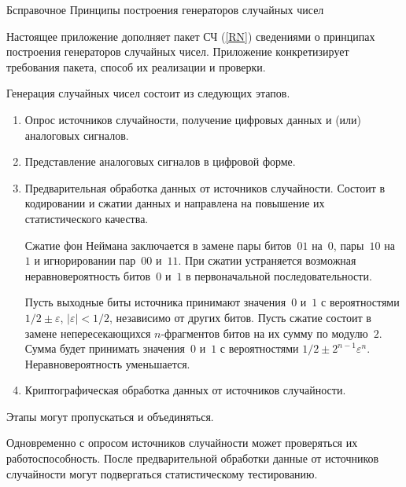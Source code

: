 \begin{appendix}{Б}{справочное}
{Принципы построения генераторов случайных чисел}
\label{RNG} 

\label{RNG.Intro}

Настоящее приложение дополняет пакет СЧ (\ref{RN})
сведениями о принципах построения генераторов случайных чисел. 
%
Приложение конкретизирует требования пакета, способ их реализации и проверки.

\label{RNG.Design}

Генерация случайных чисел состоит из следующих этапов.

\begin{enumerate}
\item
Опрос источников случайности,
получение цифровых данных и (или) аналоговых сигналов.

\item
Представление аналоговых сигналов в цифровой форме.

\item
Предварительная обработка данных от источников случайности. 
Состоит в кодировании и сжатии данных и направлена на повышение их 
статистического качества. 

\begin{example}
Сжатие фон Неймана заключается в замене пары битов~$01$ на~$0$, пары~$10$ на~$1$ 
и игнорировании пар~$00$ и~$11$. При сжатии устраняется возможная 
неравновероятность битов~$0$ и~$1$ в первоначальной последовательности.
\end{example}

\begin{example}
Пусть выходные биты источника принимают значения~$0$ и~$1$ с вероятностями 
$1/2\pm\varepsilon$, $|\varepsilon|<1/2$, независимо от других битов.
%
Пусть сжатие состоит в замене непересекающихся $n$-фрагментов битов на их сумму 
по модулю~$2$. 
%
Сумма будет принимать значения~$0$ и~$1$ с вероятностями
$1/2\pm 2^{n-1}\varepsilon^n$. Неравновероятность уменьшается.
\end{example}

\item
Криптографическая обработка данных от источников случайности. 
\end{enumerate}

Этапы могут пропускаться и объединяться. 

Одновременно с опросом источников случайности может проверяться их 
работоспособность.
%
После предварительной обработки данные от источников случайности 
могут подвергаться статистическому тестированию. 


\end{appendix}
